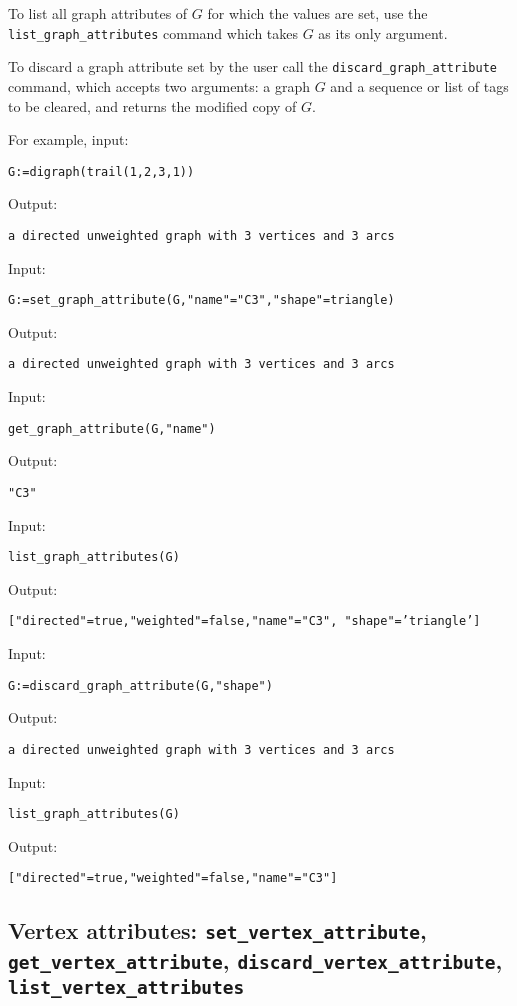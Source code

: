 \documentclass[a4paper,11pt]{article}
\begin{document}
To list all graph attributes of $ G $ for which the values are set, use the {\tt list\_graph\_attributes} command which takes $ G $ as its only argument.

To discard a graph attribute set by the user call the {\tt discard\_graph\_attribute} command, which accepts two arguments: a graph $ G $ and a sequence or list of tags to be cleared, and returns the modified copy of $ G $.

For example, input:
\begin{center}
  \tt G:=digraph(trail(1,2,3,1))
\end{center}
Output:
\begin{center}
  \tt a directed unweighted graph with 3 vertices and 3 arcs
\end{center}
Input:
\begin{center}
  \tt G:=set\_graph\_attribute(G,"name"="C3","shape"=triangle)
\end{center}
Output:
\begin{center}
  \tt a directed unweighted graph with 3 vertices and 3 arcs
\end{center}
Input:
\begin{center}
  \tt get\_graph\_attribute(G,"name")
\end{center}
Output:
\begin{center}
  \tt "C3"
\end{center}
Input:
\begin{center}
  \tt list\_graph\_attributes(G)
\end{center}
Output:
\begin{center}
  \tt ["directed"=true,"weighted"=false,"name"="C3", "shape"='triangle']
\end{center}
Input:
\begin{center}
  \tt G:=discard\_graph\_attribute(G,"shape")
\end{center}
Output:
\begin{center}
  \tt a directed unweighted graph with 3 vertices and 3 arcs
\end{center}
Input:
\begin{center}
  \tt list\_graph\_attributes(G)
\end{center}
Output:
\begin{center}
  \tt ["directed"=true,"weighted"=false,"name"="C3"]
\end{center}

\subsection{Vertex attributes: {\tt set\_vertex\_attribute}, {\tt get\_vertex\_attribute}, {\tt discard\_vertex\_attribute}, {\tt list\_vertex\_attributes}}
\end{document}
